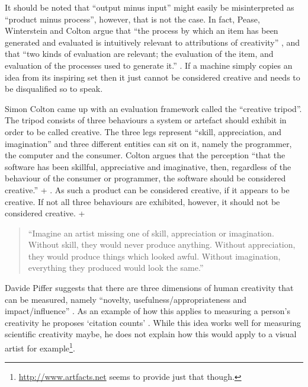 It should be noted that ``output minus input'' might easily be misinterpreted as ``product minus process'', however, that is not the case. In fact, Pease, Winterstein and Colton argue that ``the process by which an item has been generated and evaluated is intuitively relevant to attributions of creativity'' \citeyear[p.6]{Pease2001}, and that ``two kinds of evaluation are relevant; the evaluation of the item, and evaluation of the processes used to generate it.'' \citeyear[p.7]{Pease2001}. If a machine simply copies an idea from its inspiring set then it just cannot be considered creative and needs to be disqualified so to speak.

Simon Colton came up with an evaluation framework called the ``creative tripod''. The tripod consists of three behaviours a system or artefact should exhibit in order to be called creative. The three legs represent ``skill, appreciation, and imagination'' and three different entities can sit on it, namely the programmer, the computer and the consumer. Colton argues that the perception ``that the software has been skillful, appreciative and imaginative, then, regardless of the behaviour of the consumer or programmer, the software should be considered creative.'' \citeyear[p.5]{Colton2008a} + \citeyear[p.5]{Colton2008}. As such a product can be considered creative, if it appears to be creative. If not all three behaviours are exhibited, however, it should not be considered creative. \autocite[p.5]{Colton2008a} + \autocite[p.5]{Colton2008}

\begin{quotation}
  ``Imagine an artist missing one of skill, appreciation or imagination. Without skill, they would never produce anything. Without appreciation, they would produce things which looked awful. Without imagination, everything they produced would look the same.'' 
\end{quotation}

Davide Piffer suggests that there are three dimensions of human creativity that can be measured, namely ``novelty, usefulness/appropriateness and impact/influence'' \citeyear[p.258-259]{Piffer2012}. As an example of how this applies to measuring a person's creativity he proposes `citation counts' \autocite[p.261]{Piffer2012}. While this idea works well for measuring scientific creativity maybe, he does not explain how this would apply to a visual artist for example\footnote{\url{http://www.artfacts.net} seems to provide just that though.}.

